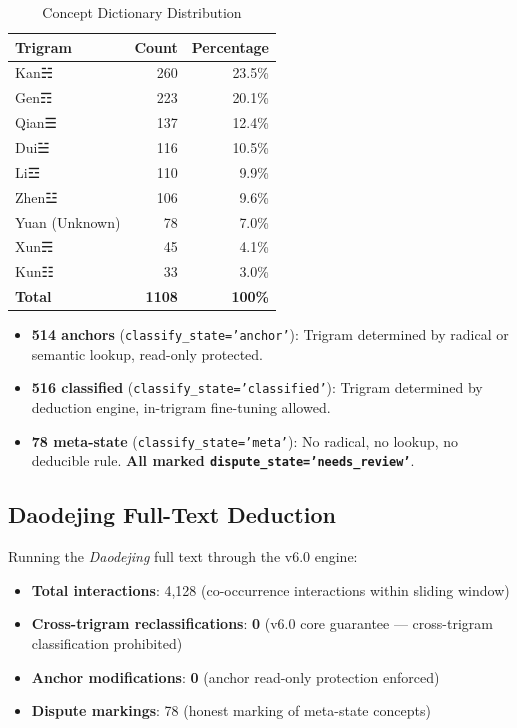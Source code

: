 \documentclass[11pt,a4paper]{article}
\begin{document}
\begin{table}[ht]
\centering
\caption{Concept Dictionary Distribution}
\begin{tabular}{lrr}
\toprule
Trigram & Count & Percentage \\
\midrule
Kan☵  & 260 & 23.5\% \\
Gen☶  & 223 & 20.1\% \\
Qian☰ & 137 & 12.4\% \\
Dui☱  & 116 & 10.5\% \\
Li☲   & 110 & 9.9\% \\
Zhen☳ & 106 & 9.6\% \\
Yuan (Unknown) & 78 & 7.0\% \\
Xun☴  & 45 & 4.1\% \\
Kun☷  & 33 & 3.0\% \\
\midrule
\textbf{Total} & \textbf{1108} & \textbf{100\%} \\
\bottomrule
\end{tabular}
\end{table}

\begin{itemize}
    \item \textbf{514 anchors} (\texttt{classify\_state='anchor'}): Trigram determined by radical or semantic lookup, read-only protected.
    \item \textbf{516 classified} (\texttt{classify\_state='classified'}): Trigram determined by deduction engine, in-trigram fine-tuning allowed.
    \item \textbf{78 meta-state} (\texttt{classify\_state='meta'}): No radical, no lookup, no deducible rule. \textbf{All marked \texttt{dispute\_state='needs\_review'}}.
\end{itemize}

\subsection{Daodejing Full-Text Deduction}

Running the \textit{Daodejing} full text through the v6.0 engine:

\begin{itemize}
    \item \textbf{Total interactions}: 4,128 (co-occurrence interactions within sliding window)
    \item \textbf{Cross-trigram reclassifications}: \textbf{0} (v6.0 core guarantee — cross-trigram classification prohibited)
    \item \textbf{Anchor modifications}: \textbf{0} (anchor read-only protection enforced)
    \item \textbf{Dispute markings}: 78 (honest marking of meta-state concepts)
\end{itemize}
\end{document}
